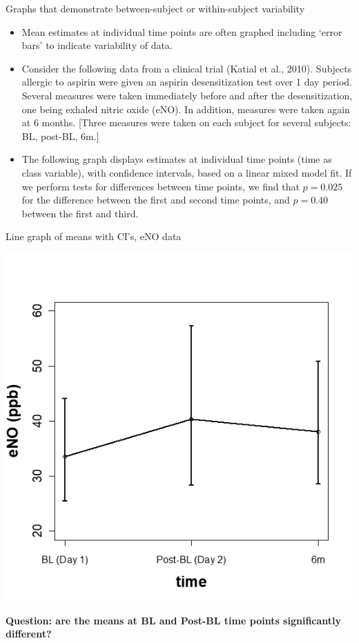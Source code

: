 \documentclass[
  9pt,
  ignorenonframetext,
]{beamer}
\begin{document}
\begin{frame}{Graphs that demonstrate between-subject or within-subject
variability}
\protect\hypertarget{graphs-that-demonstrate-between-subject-or-within-subject-variability}{}
\begin{itemize}
\item
  Mean estimates at individual time points are often graphed including
  `error bars' to indicate variability of data.
\item
  Consider the following data from a clinical trial (Katial et al.,
  2010). Subjects allergic to aspirin were given an aspirin
  desensitization test over 1 day period. Several measures were taken
  immediately before and after the desensitization, one being exhaled
  nitric oxide (eNO). In addition, measures were taken again at 6
  months. {[}Three measures were taken on each subject for several
  subjects: BL, post-BL, 6m.{]}
\item
  The following graph displays estimates at individual time points (time
  as class variable), with confidence intervals, based on a linear mixed
  model fit. If we perform tests for differences between time points, we
  find that \(p=0.025\) for the difference between the first and second
  time points, and \(p=0.40\) between the first and third.
\end{itemize}
\end{frame}

\begin{frame}{Line graph of means with CI's, eNO data}
\protect\hypertarget{line-graph-of-means-with-cis-eno-data}{}
\tiny

\begin{center}\includegraphics[width=0.4\linewidth]{figs_L2/L2-f8} \end{center}

\tiny

\textbf{Question: are the means at BL and Post-BL time points
significantly different?}
\end{frame}
\end{document}

